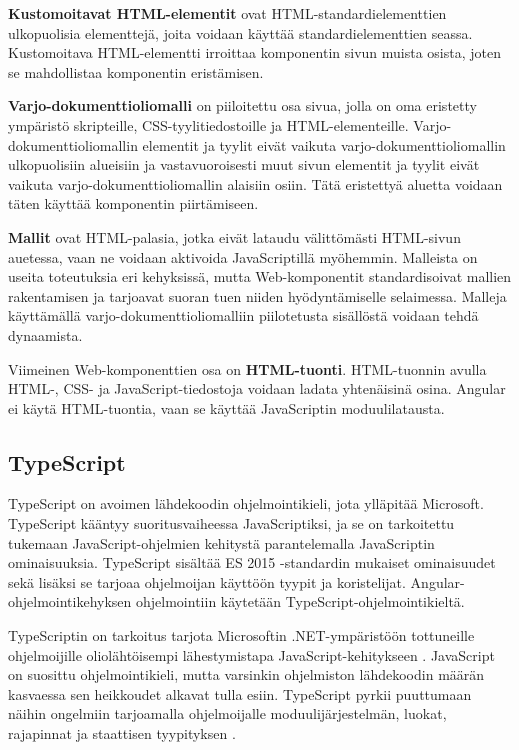 \documentclass[utf8]{gradu3}
\begin{document}
\textbf{Kustomoitavat HTML-elementit} ovat HTML-standardielementtien ulkopuolisia elementtejä, joita voidaan käyttää standardielementtien seassa. Kustomoitava HTML-elementti irroittaa komponentin sivun muista osista, joten se mahdollistaa komponentin eristämisen. 

\textbf{Varjo-dokumenttioliomalli} on piiloitettu osa sivua, jolla on oma eristetty ympäristö skripteille, CSS-tyylitiedostoille ja HTML-elementeille. Varjo-dokumenttioliomallin elementit ja tyylit eivät vaikuta varjo-dokumenttioliomallin ulkopuolisiin alueisiin ja vastavuoroisesti muut sivun elementit ja tyylit eivät vaikuta varjo-dokumenttioliomallin alaisiin osiin. Tätä eristettyä aluetta voidaan täten käyttää komponentin piirtämiseen. 

\textbf{Mallit} ovat HTML-palasia, jotka eivät lataudu välittömästi HTML-sivun auetessa, vaan ne voidaan aktivoida JavaScriptillä myöhemmin. Malleista on useita toteutuksia eri kehyksissä, mutta Web-komponentit standardisoivat mallien rakentamisen ja tarjoavat suoran tuen niiden hyödyntämiselle selaimessa. Malleja käyttämällä varjo-dokumenttioliomalliin piilotetusta sisällöstä voidaan tehdä dynaamista. 

Viimeinen Web-komponenttien osa on \textbf{HTML-tuonti}. HTML-tuonnin avulla HTML-, CSS- ja JavaScript-tiedostoja voidaan ladata yhtenäisinä osina. Angular ei käytä HTML-tuontia, vaan se käyttää JavaScriptin moduulilatausta. \parencite[]{angular-6-by-example}

\subsection{TypeScript}

TypeScript on avoimen lähdekoodin ohjelmointikieli, jota ylläpitää Microsoft. TypeScript kääntyy suoritusvaiheessa JavaScriptiksi, ja se on tarkoitettu tukemaan JavaScript-ohjelmien kehitystä parantelemalla JavaScriptin ominaisuuksia. TypeScript sisältää ES 2015 -standardin mukaiset ominaisuudet sekä lisäksi se tarjoaa ohjelmoijan käyttöön tyypit ja koristelijat. Angular-ohjelmointikehyksen ohjelmointiin käytetään TypeScript-ohjelmointikieltä.

TypeScriptin on tarkoitus tarjota Microsoftin .NET-ympäristöön tottuneille ohjelmoijille oliolähtöisempi lähestymistapa JavaScript-kehitykseen \parencite[]{maharry-typescript}. JavaScript on suosittu ohjelmointikieli, mutta varsinkin ohjelmiston lähdekoodin määrän kasvaessa sen heikkoudet alkavat tulla esiin. TypeScript pyrkii puuttumaan näihin ongelmiin tarjoamalla ohjelmoijalle moduulijärjestelmän, luokat, rajapinnat ja staattisen tyypityksen \parencite[]{understanding-typescript}.
\end{document}
